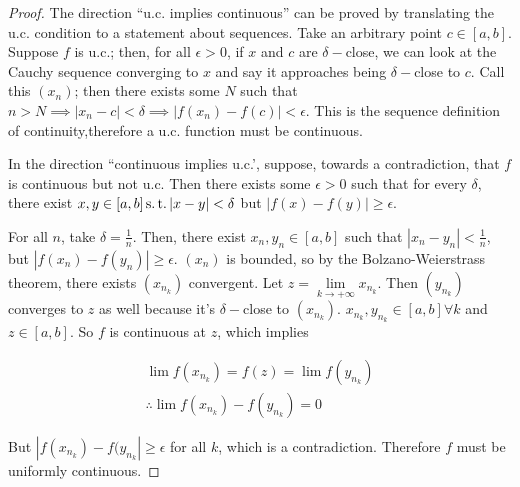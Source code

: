 \documentclass[./analysis.tex]{subfiles}
\begin{document}
    \begin{proof}
        The direction ``u.c. implies continuous'' can be proved by translating the u.c. condition to a statement about sequences. Take an arbitrary point $c \in [a, b]$. Suppose $f$ is u.c.; then, for all $\epsilon > 0$, if $x$ and $c$ are $\delta-$close, we can look at the Cauchy sequence converging to $x$ and say it approaches being $\delta-$close to $c$. Call this $(x_n)$; then there exists some $N$ such that $n > N \implies |x_n - c| < \delta \implies |f(x_n) - f(c)| < \epsilon$. This is the sequence definition of continuity,therefore a u.c. function must be continuous.

        In the direction ``continuous implies u.c.', suppose, towards a contradiction, that $f$ is continuous but not u.c. Then there exists some $\epsilon > 0$ such that for every $\delta$, there exist $x, y \in [a, b] \operatorname{s.t.} |x - y| < \delta$ but $|f(x) - f(y)| \geq \epsilon$.

        For all $n$, take $\delta = \frac{1}{n}$. Then, there exist $x_n, y_n \in [a, b]$ such that $|x_n - y_n| < \frac{1}{n}$, but $|f(x_n) - f(y_n)| \geq \epsilon$. $(x_n)$ is bounded, so by the Bolzano-Weierstrass theorem, there exists $(x_{n_k})$ convergent. Let $z = \lim\limits_{k\to +\infty} x_{n_k}$. Then $(y_{n_k})$ converges to $z$ as well because it's $\delta-$close to $(x_{n_k})$. $x_{n_k}, y_{n_k} \in [a, b] \forall k$ and $z \in [a, b]$. So $f$ is continuous at $z$, which implies

        \begin{align*}
            \lim f(x_{n_k}) = f(z) = \lim f(y_{n_k})\\
            \therefore \lim f(x_{n_k}) - f(y_{n_k}) = 0
        \end{align*}

        But $|f(x_{n_k}) - f(y_{n_k}| \geq \epsilon$ for all $k$, which is a contradiction. Therefore $f$ must be uniformly continuous.
    \end{proof}
\end{document}
